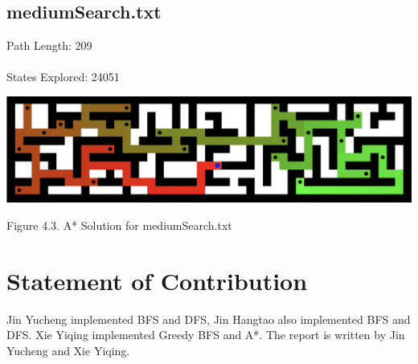 \documentclass{mcmthesis}
\begin{document}
\subsection{mediumSearch.txt}
Path Length: 209 \\ \\
States Explored: 24051
\begin{center}
\includegraphics[width=15cm]{medium.png}
\end{center}
\begin{center}
\small{Figure 4.3. A* Solution for mediumSearch.txt}
\end{center}

\section{Statement of Contribution}
Jin Yucheng implemented BFS and DFS, Jin Hangtao also implemented BFS and DFS. Xie Yiqing implemented Greedy BFS and A*. The report is written by Jin Yucheng and Xie Yiqing.  
\end{document}
